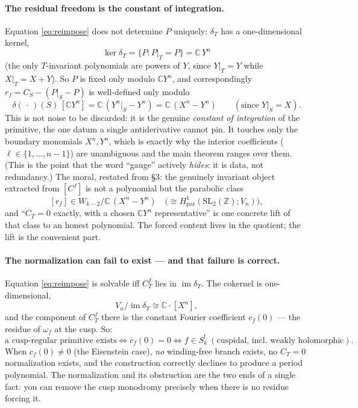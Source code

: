 \documentclass[11pt]{article}
\newcommand{\ZZ}{\mathbb{Z}}
\newcommand{\CC}{\mathbb{C}}
\newcommand{\SLZ}{\mathrm{SL}_2(\ZZ)}
\newcommand{\Vn}{V_n}
\DeclareMathOperator{\im}{im}
\begin{document}
\paragraph{The residual freedom is the constant of integration.}
Equation \eqref{eq:reimpose} does not determine $P$ uniquely: $\delta_T$
has a one-dimensional kernel,
\[
  \ker \delta_T = \{P : P|_T = P\} = \CC\, Y^n
\]
(the only $T$-invariant polynomials are powers of $Y$, since
$Y|_T = Y$ while $X|_T = X+Y$). So $P$ is fixed only modulo $\CC Y^n$,
and correspondingly $r_f = C_S - (P|_S - P)$ is well-defined only modulo
\[
  \delta(\,\cdot\,)(S)\,[\CC Y^n] = \CC\,(Y^n|_S - Y^n) = \CC\,(X^n - Y^n)
  \qquad (\text{since } Y|_S = X).
\]
This is not noise to be discarded: it is the genuine \emph{constant of
integration} of the primitive, the one datum a single antiderivative
cannot pin. It touches only the boundary monomials $X^n, Y^n$, which is
exactly why the interior coefficients
($\ell \in \{1,\dots,n-1\}$) are unambiguous and the main theorem ranges
over them. (This is the point that the word ``gauge'' actively
\emph{hides}: it is data, not redundancy.) The moral, restated from \S3:
the genuinely invariant object extracted from $[C^f]$ is not a polynomial
but the parabolic class
\[
  [r_f] \in W_{k-2}\big/\CC\,(X^n - Y^n)
  \quad\bigl(\cong H^1_{\mathrm{par}}(\SLZ; \Vn)\bigr),
\]
and ``$C_T = 0$ exactly, with a chosen $\CC Y^n$ representative'' is one
concrete lift of that class to an honest polynomial. The forced content
lives in the quotient; the lift is the convenient part.

\paragraph{The normalization can fail to exist --- and that failure is correct.}
Equation \eqref{eq:reimpose} is solvable iff $C^f_T$ lies in
$\im \delta_T$. The cokernel is one-dimensional,
\[
  \Vn / \im \delta_T \cong \CC\cdot[X^n],
\]
and the component of $C^f_T$ there is the constant Fourier coefficient
$c_f(0)$ --- the residue of $\omega_f$ at the cusp. So:
\[
  \text{a cusp-regular primitive exists}
  \iff c_f(0) = 0
  \iff f \in S^!_k \ (\text{cuspidal, incl.\ weakly holomorphic}).
\]
When $c_f(0) \neq 0$ (the Eisenstein case), \emph{no} winding-free branch
exists, no $C_T=0$ normalization exists, and the construction correctly
declines to produce a period polynomial. The normalization and its
obstruction are the two ends of a single fact: you can remove the cusp
monodromy precisely when there is no residue forcing it.
\end{document}
